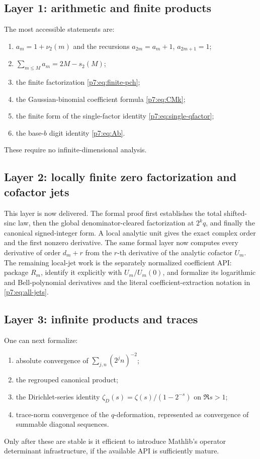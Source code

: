 \documentclass[11pt]{article}
\numberwithin{equation}{section}
\theoremstyle{definition}
\theoremstyle{remark}
\begin{document}
\subsection{Layer 1: arithmetic and finite products}

The most accessible statements are:
\begin{enumerate}[leftmargin=2em]
\item $a_m=1+\nu_2(m)$ and the recursions $a_{2m}=a_m+1$, $a_{2m+1}=1$;
\item $\sum_{m\le M}a_m=2M-s_2(M)$;
\item the finite factorization \cref{p7:eq:finite-pch};
\item the Gaussian-binomial coefficient formula \cref{p7:eq:CMk};
\item the finite form of the single-factor identity \cref{p7:eq:single-qfactor};
\item the base-$b$ digit identity \cref{p7:eq:Ab}.
\end{enumerate}
These require no infinite-dimensional analysis.

\subsection{Layer 2: locally finite zero factorization and cofactor jets}

This layer is now delivered.  The formal proof first establishes the total
shifted-sinc law, then the global denominator-cleared factorization at
\(2^kq\), and finally the canonical signed-integer form.  A local analytic
unit gives the exact complex order and the first nonzero derivative.  The
same formal layer now computes every derivative of order \(d_m+r\) from the
\(r\)-th derivative of the analytic cofactor \(U_m\).  The remaining
local-jet work is the separately normalized coefficient API: package \(R_m\),
identify it explicitly with \(U_m/U_m(0)\), and formalize its logarithmic and
Bell-polynomial derivatives and the literal coefficient-extraction notation
in \cref{p7:eq:all-jets}.

\subsection{Layer 3: infinite products and traces}

One can next formalize:
\begin{enumerate}[leftmargin=2em]
\item absolute convergence of $\sum_{j,n}(2^jn)^{-2}$;
\item the regrouped canonical product;
\item the Dirichlet-series identity $\zeta_D(s)=\zeta(s)/(1-2^{-s})$ on $\Re s>1$;
\item trace-norm convergence of the $q$-deformation, represented as convergence of summable diagonal sequences.
\end{enumerate}
Only after these are stable is it efficient to introduce Mathlib's operator determinant infrastructure, if the available API is sufficiently mature.
\end{document}
